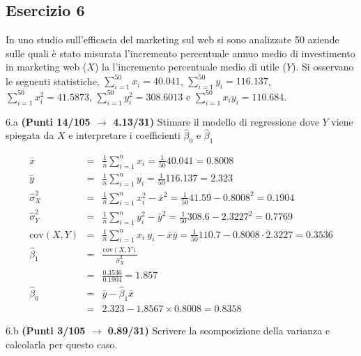 \documentclass[
  11pt,
]{book}
\theoremstyle{mytheoremstyle}
\theoremstyle{mydefstyle}
\newenvironment{sol}
  {
  \begin{tcolorbox}[enhanced,breakable,arc=0.1mm,boxrule=1pt,colback=white,colframe=iblue,
  title=\bf \fontfamily{lmss}\selectfont \hspace{.5 cm} Soluzione,drop fuzzy shadow]

}{
\end{tcolorbox}
  }
\begin{document}
\subsection{Esercizio 6}\label{esercizio-6-25}

In uno studio sull'efficacia del marketing sul web si sono analizzate 50 aziende
sulle quali è stato misurata l'incremento percentuale annuo medio di investimento in marketing
web (\(X\)) la l'incremento percentuale medio di utile (\(Y\)). Si osservano le seguenti statistiche, \(\sum_{i=1}^{50}x_i=40.041\), \(\sum_{i=1}^{50}y_i=116.137\),
\(\sum_{i=1}^{50}x_i^2=41.5873\), \(\sum_{i=1}^{50}y_i^2=308.6013\) e \(\sum_{i=1}^{50}x_iy_i=110.684\).

6.a \textbf{(Punti 14/105 \(\rightarrow\) 4.13/31)} Stimare il modello di regressione dove \(Y\) viene spiegata da \(X\) e interpretare
i coefficienti \(\hat\beta_0\) e \(\hat\beta_1\)

\begin{sol}
\begin{eqnarray*}
           \bar x &=&\frac 1 n\sum_{i=1}^n x_i = \frac {1}{ 50 }  40.041 =  0.8008 \\
           \bar y &=&\frac 1 n\sum_{i=1}^n y_i = \frac {1}{ 50 }  116.137 =  2.323 \\
           \hat\sigma_X^2&=&\frac 1 n\sum_{i=1}^n x_i^2-\bar x^2=\frac {1}{ 50 }  41.59  - 0.8008 ^2= 0.1904 \\
           \hat\sigma_Y^2&=&\frac 1 n\sum_{i=1}^n y_i^2-\bar y^2=\frac {1}{ 50 }  308.6  - 2.3227 ^2= 0.7769 \\
           \text{cov}(X,Y)&=&\frac 1 n\sum_{i=1}^n x_i~y_i-\bar x\bar y=\frac {1}{ 50 }  110.7 - 0.8008 \cdot 2.3227 = 0.3536 \\
           \hat\beta_1 &=& \frac{\text{cov}(X,Y)}{\hat\sigma_X^2} \\
                    &=& \frac{ 0.3536 }{ 0.1904 }  =  1.857 \\
           \hat\beta_0 &=& \bar y - \hat\beta_1 \bar x\\
                    &=&  2.323 - 1.8567 \times  0.8008 = 0.8358 
         \end{eqnarray*}

\end{sol}

6.b \textbf{(Punti 3/105 \(\rightarrow\) 0.89/31)} Scrivere la scomposizione della varianza e
calcolarla per questo caso.
\end{document}
